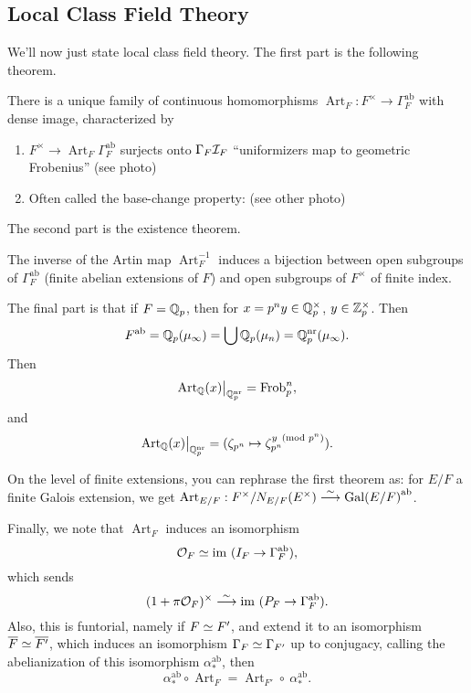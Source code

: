 \subsection{Local Class Field Theory} We'll now just state local class field
theory. The first part is the following theorem.

\begin{thm}
There is a unique family of continuous homomorphisms $\operatorname{Art}_F :
F^\times \to \Gamma_F^{\operatorname{ab}}$ with dense image, characterized by
\begin{enumerate}[(1)]
\item $F^\times \rightarrow{\operatorname{Art}_F} \Gamma_F^{\operatorname{ab}}$
surjects onto $\Gamma_F\mathcal{I}_F$ ``uniformizers map to geometric Frobenius''
(see photo)
\item Often called the base-change property: (see other photo)
\end{enumerate}
\end{thm}

The second part is the existence theorem.

\begin{thm}
The inverse of the Artin map $\operatorname{Art}_F^{-1}$ induces a bijection
between open subgroups of $\Gamma_F^{\operatorname{ab}}$ (finite abelian
extensions of $F$) and open subgroups of $F^\times$ of finite index.
\end{thm}

The final part is that if $F = \mathbb{Q}_p$, then for $x = p^n y \in \mathbb{Q}_p^\times$, $y \in
\mathbb{Z}_p^\times$. Then \[F^{\operatorname{ab}} = \mathbb{Q}_p(\mu_\infty) = \bigcup \mathbb{Q}_p(\mu_n) =
\mathbb{Q}_p^{\operatorname{nr}}(\mu_\infty).\] Then \[
\restr{\operatorname{Art}_\rats(x)}{\Qp^{\operatorname{nr}}} =
\operatorname{Frob}_p^n, \]
and \[
\restr{\operatorname{Art}_\rats(x)}{\Qp^{\operatorname{nr}}} = (\zeta_{p^n}
\mapsto \zeta_{p^n}^{y \pmod{p^n}}). \]

On the level of finite extensions, you can rephrase the first theorem as: for
$E/F$ a finite Galois extension, we get $\operatorname{Art}_{E/F} :
F^\times/N_{E/F}(E^\times) \stackrel{\sim}{\longrightarrow} \mathrm{Gal}{(E / F)}^{\operatorname{ab}}$.

Finally, we note that $\operatorname{Art}_F$ induces an isomorphism
\[ \mathcal{O}_F \simeq \mathrm{im} \  (I_F \rightarrow \Gamma_F^{\operatorname{ab}}), \]
which sends 
\[ (1 + \pi \mathcal{O}_F)^\times \stackrel{\sim}{\longrightarrow} \mathrm{im} \  (P_F \rightarrow
                                            \Gamma_F^{\operatorname{ab}}). \]
Also, this is funtorial, namely if $F \simeq F'$, and extend it to an isomorphism
$\overline{F} \simeq \overline{F'}$, which induces an isomorphism $\Gamma_F \simeq
\Gamma_{F'}$ up to conjugacy, calling the abelianization of this isomorphism
$\alpha_*^{\operatorname{ab}}$, then
\[ \alpha_*^{\operatorname{ab}} \circ \operatorname{Art}_F =
  \operatorname{Art}_{F'} \circ \ \alpha_*^{\operatorname{ab}}. \]

